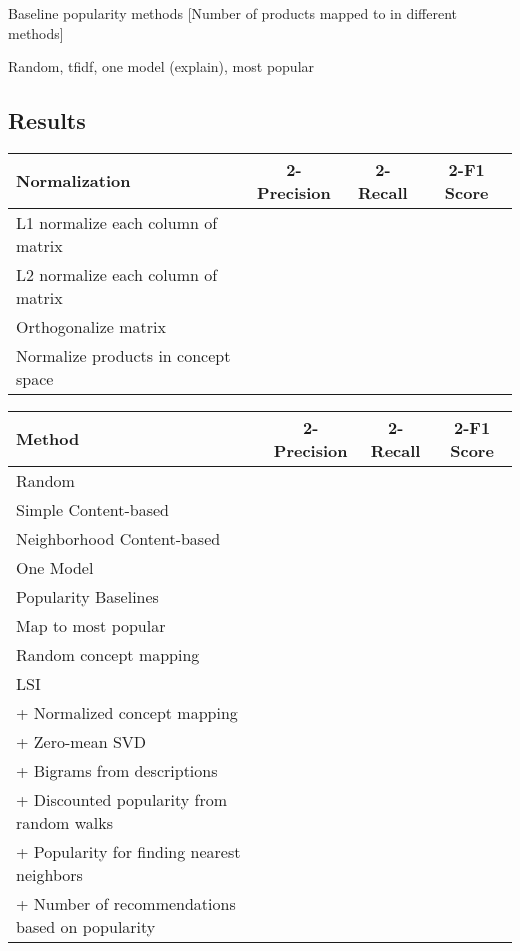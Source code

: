 \documentclass[11pt]{article}
\begin{document}
Baseline popularity methods
[Number of products mapped to in different methods]

Random, tfidf, one model (explain), most popular

\subsection*{Results}
\begin{center}
\begin{tabular}{ | l | c | c | c |}
\hline
Normalization & 2-Precision & 2-Recall & 2-F1 Score \\ \hline\hline
L1 normalize each column of matrix &&&\\ \hline
L2 normalize each column of matrix &&&\\ \hline
Orthogonalize matrix &&&\\ \hline
Normalize products in concept space &&&\\ \hline
\end{tabular}
\end{center}

\begin{center}
\begin{tabular}{ | l | c | c | c |}
\hline
Method & 2-Precision & 2-Recall & 2-F1 Score \\ \hline\hline
Random &&&\\ \hline
Simple Content-based &&&\\ \hline
Neighborhood Content-based &&&\\ \hline
One Model &&&\\ \hline
Popularity Baselines &&&\\ \hline
\hspace*{0.5cm} Map to most popular &&&\\ \hline
\hspace*{0.5cm} Random concept mapping &&&\\ \hline
LSI &&&\\ \hline
\hspace*{0.5cm} + Normalized concept mapping &&&\\ \hline
\hspace*{0.5cm} + Zero-mean SVD &&&\\ \hline
\hspace*{0.5cm} + Bigrams from descriptions &&&\\ \hline
\hspace*{0.5cm} + Discounted popularity from random walks &&&\\ \hline
\hspace*{0.5cm} + Popularity for finding nearest neighbors &&&\\ \hline
\hspace*{0.5cm} + Number of recommendations based on popularity &&&\\ \hline

\end{tabular}
\end{center}
\end{document}
